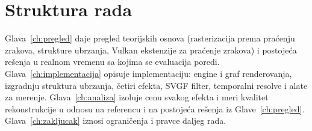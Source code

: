 \section{Struktura rada}

Glava~\ref{ch:pregled} daje pregled teorijskih osnova (rasterizacija prema pra\'cenju zrakova, strukture
ubrzanja, Vulkan ekstenzije za pra\'cenje zrakova) i postoje\'ca re\v{s}enja u realnom vremenu sa kojima se
evaluacija poredi. Glava~\ref{ch:implementacija} opisuje implementaciju: engine i graf renderovanja,
izgradnju struktura ubrzanja, \v{c}etiri efekta, SVGF filter, temporalni resolve i alate za merenje.
Glava~\ref{ch:analiza} izoluje cenu svakog efekta i meri kvalitet rekonstrukcije u odnosu na referencu i na
postoje\'ca re\v{s}enja iz Glave~\ref{ch:pregled}. Glava~\ref{ch:zakljucak} iznosi ograni\v{c}enja i
pravce daljeg rada.

